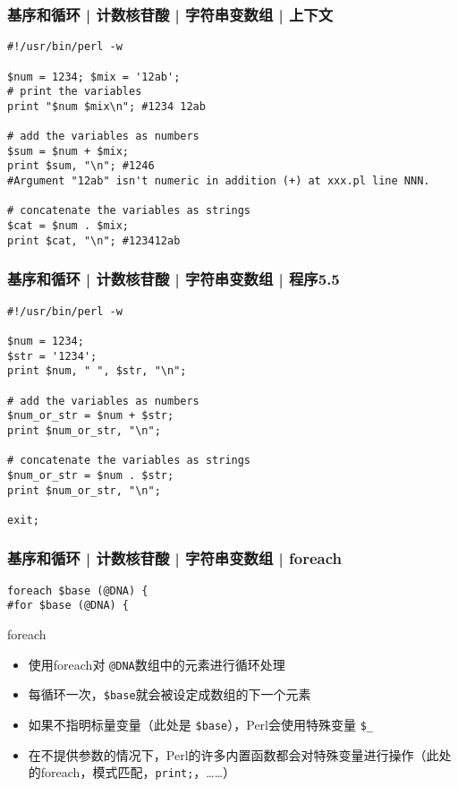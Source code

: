 \begin{frame}[fragile]
  \frametitle{基序和循环 | 计数核苷酸 | 字符串变数组 | 上下文}
\begin{lstlisting}
#!/usr/bin/perl -w

$num = 1234; $mix = '12ab';
# print the variables
print "$num $mix\n"; #1234 12ab

# add the variables as numbers
$sum = $num + $mix;
print $sum, "\n"; #1246
#Argument "12ab" isn't numeric in addition (+) at xxx.pl line NNN.

# concatenate the variables as strings
$cat = $num . $mix;
print $cat, "\n"; #123412ab
\end{lstlisting}
\end{frame}

\begin{frame}[fragile]
  \frametitle{基序和循环 | 计数核苷酸 | 字符串变数组 | \alert{程序5.5}}
\begin{lstlisting}
#!/usr/bin/perl -w

$num = 1234;
$str = '1234';
print $num, " ", $str, "\n";

# add the variables as numbers
$num_or_str = $num + $str;
print $num_or_str, "\n";

# concatenate the variables as strings
$num_or_str = $num . $str;
print $num_or_str, "\n";

exit;
\end{lstlisting}
\end{frame}


\begin{frame}[fragile]
  \frametitle{基序和循环 | 计数核苷酸 | 字符串变数组 | \alert{foreach}}
\begin{lstlisting}
foreach $base (@DNA) {
#for $base (@DNA) {
\end{lstlisting}
\pause
\begin{block}{foreach}
  \begin{itemize}
    \item 使用foreach对 \verb|@DNA|数组中的元素进行循环处理
    \item 每循环一次，\verb|$base|就会被设定成数组的下一个元素
    \item 如果不指明标量变量（此处是 \verb|$base|），Perl会使用特殊变量 \verb|$_|
    \item 在不提供参数的情况下，Perl的许多内置函数都会对特殊变量进行操作（此处的foreach，模式匹配，\verb|print;|，……）
  \end{itemize}
\end{block}
\end{frame}

